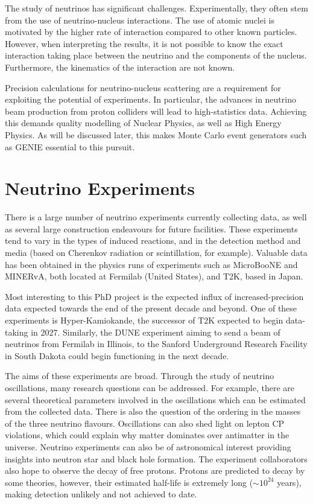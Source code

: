 The study of neutrinos has significant challenges. Experimentally, they often stem from the use of neutrino-nucleus interactions. The use of atomic nuclei is motivated by the higher rate of interaction compared to other known particles. However, when interpreting the results, it is not possible to know the exact interaction taking place between the neutrino and the components of the nucleus. Furthermore, the kinematics of the interaction are not known\cite{NustecWP}.

Precision calculations for neutrino-nucleus scattering are a requirement for exploiting the potential of experiments. In particular, the advances in neutrino beam production from proton colliders will lead to high-statistics data. Achieving this demands quality modelling of Nuclear Physics, as well as High Energy Physics. As will be discussed later, this makes Monte Carlo event generators such as GENIE essential to this pursuit. 


\section{Neutrino Experiments}

There is a large number of neutrino experiments currently collecting data, as well as several large construction endeavours for future facilities. These experiments tend to vary in the types of induced reactions, and in the detection method and media (based on Cherenkov radiation or scintillation, for example). Valuable data has been obtained in the physics runs of experiments such as MicroBooNE and MINERvA, both located at Fermilab (United States), and T2K, based in Japan. 

Most interesting to this PhD project is the expected influx of increased-precision data expected towards the end of the present decade and beyond. One of these experiments is Hyper-Kamiokande, the successor of T2K expected to begin data-taking in 2027. Similarly, the DUNE experiment aiming to send a beam of neutrinos from Fermilab in Illinois, to the Sanford Underground Research Facility in South Dakota could begin functioning in the next decade.

The aims of these experiments are broad\cite{hyperk,dune}. Through the study of neutrino oscillations, many research questions can be addressed. For example, there are several theoretical parameters involved in the oscillations which can be estimated from the collected data. There is also the question of the ordering in the masses of the three neutrino flavours. Oscillations can also shed light on lepton CP violations, which could explain why matter dominates over antimatter in the universe. Neutrino experiments can also be of astronomical interest providing insights into neutron star and black hole formation. The experiment collaborators also hope to observe the decay of free protons. Protons are predicted to decay by some theories, however, their estimated half-life is extremely long ($\sim 10^{24}$ years), making detection unlikely and not achieved to date.

